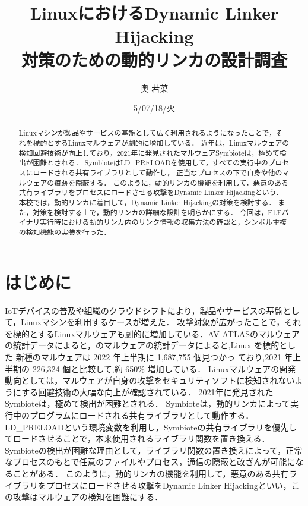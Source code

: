 \documentclass[submit,techreq,noauthor,dvipdfmx]{mid-eco}
\begin{document}
\date   {5/07/18/火}				%
\title  {LinuxにおけるDynamic Linker Hijacking\\対策のための動的リンカの設計調査}	%
\author {奥 若菜}				%


\begin{abstract}
	Linuxマシンが製品やサービスの基盤として広く利用されるようになったことで，それを標的とするLinuxマルウェアが劇的に増加している．
  近年は，Linuxマルウェアの検知回避技術が向上しており，2021年に発見されたマルウェアSymbioteは，極めて検出が困難とされる．
  SymbioteはLD\_PRELOADを使用して，すべての実行中のプロセスにロードされる共有ライブラリとして動作し，
  正当なプロセスの下で自身や他のマルウェアの痕跡を隠蔽する．
  このように，動的リンカの機能を利用して，悪意のある共有ライブラリをプロセスにロードさせる攻撃をDynamic Linker Hijackingという．
  本校では，動的リンカに着目して，Dynamic Linker Hijackingの対策を検討する．
  また，対策を検討する上で，動的リンカの詳細な設計を明らかにする．
  今回は，ELFバイナリ実行時における動的リンカ内のリンク情報の収集方法の確認と，シンボル重複の検知機能の実装を行った．
\end{abstract}
\maketitle


\section{はじめに}
IoTデバイスの普及や組織のクラウドシフトにより，製品やサービスの基盤として，Linuxマシンを利用するケースが増えた．
攻撃対象が広がったことで，それを標的とするLinuxマルウェアも劇的に増加している．AV-ATLASのマルウェアの統計データによると，のマルウェアの統計データによると,Linux を標的とした
新種のマルウェアは 2022 年上半期に 1,687,755 個見つかっ
ており,2021 年上半期の 226,324 個と比較して,約 650\%
増加している\cite{AV-TEST}．
Linuxマルウェアの開発動向としては，マルウェアが自身の攻撃をセキュリティソフトに検知されないようにする回避技術の大幅な向上が確認されている\cite{IBM}．
2021年に発見されたSymbioteは，極めて検出が困難とされる\cite{Symbiote}．
Symbioteは，動的リンカによって実行中のプログラムにロードされる共有ライブラリとして動作する．
LD\_PRELOADという環境変数を利用し，Symbioteの共有ライブラリを優先してロードさせることで，本来使用されるライブラリ関数を置き換える．
Symbioteの検出が困難な理由として，ライブラリ関数の置き換えによって，正常なプロセスのもとで任意のファイルやプロセス，通信の隠蔽と改ざんが可能になることがある．
このように，動的リンカの機能を利用して，悪意のある共有ライブラリをプロセスにロードさせる攻撃をDynamic Linker Hijackingといい，この攻撃はマルウェアの検知を困難にする．
\end{document}

